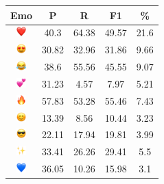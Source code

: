 \documentclass{article}
\begin{document}
\begin{table}
\centering
\begin{tabular}{|c|ccc|c|} \hline
\textbf{Emo} & \textbf{P} & \textbf{R} & \textbf{F1} & \textbf{\%} \\ \hline
\includegraphics[height=0.37cm,width=0.37cm]{img/red_heart.png} & 40.3 & 64.38 & 49.57 & 21.6\\ 
\includegraphics[height=0.37cm,width=0.37cm]{img/smiling_face_with_hearteyes.png} & 30.82 & 32.96 & 31.86 & 9.66\\ 
\includegraphics[height=0.37cm,width=0.37cm]{img/face_with_tears_of_joy.png} & 38.6 & 55.56 & 45.55 & 9.07\\ 
\includegraphics[height=0.37cm,width=0.37cm]{img/two_hearts.png} & 31.23 & 4.57 & 7.97 & 5.21\\ 
\includegraphics[height=0.37cm,width=0.37cm]{img/fire.png} & 57.83 & 53.28 & 55.46 & 7.43\\ 
\includegraphics[height=0.37cm,width=0.37cm]{img/smiling_face_with_smiling_eyes.png} & 13.39 & 8.56 & 10.44 & 3.23\\ 
\includegraphics[height=0.37cm,width=0.37cm]{img/smiling_face_with_sunglasses.png} & 22.11 & 17.94 & 19.81 & 3.99\\ 
\includegraphics[height=0.37cm,width=0.37cm]{img/sparkles.png} & 33.41 & 26.26 & 29.41 & 5.5\\ 
\includegraphics[height=0.37cm,width=0.37cm]{img/blue_heart.png} & 36.05 & 10.26 & 15.98 & 3.1\\ 

\end{tabular}
\end{table}
\end{document}
